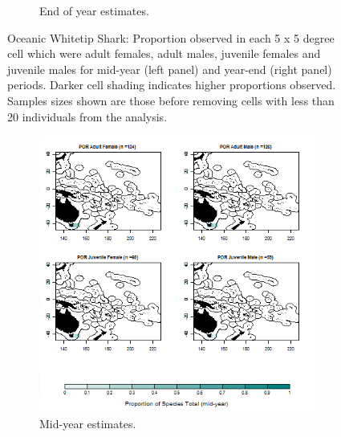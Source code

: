 \documentclass[12pt]{SCreport}
\begin{document}
\begin{landscape}
\begin{figure}
\begin{subfigure}[b]{0.6\textwidth}
       \caption{End of year estimates.}
       \label{fig:test2}
   \end{subfigure}
\caption{Oceanic Whitetip Shark: Proportion observed in each 5 x 5 degree cell which were adult females, adult males, juvenile females and juvenile males for mid-year (left panel) and year-end (right panel) periods. Darker cell shading indicates higher proportions observed. Samples sizes shown are those before removing cells with less than 20 individuals from the analysis. }
\label{fig:test} 
\end{figure}
\end{landscape}

\begin{landscape}
\begin{figure}
\centering
   \begin{subfigure}[b]{0.6\textwidth}
       \includegraphics[width=\textwidth]{../GRAPHICS/Defined/BI_30_Map_maturity_sex_POR_MY}
       \caption{Mid-year estimates.}
       \label{fig:test1}
   \end{subfigure}
   \begin{subfigure}[b]{0.6\textwidth}

\end{subfigure}
\end{figure}
\end{landscape}
\end{document}
